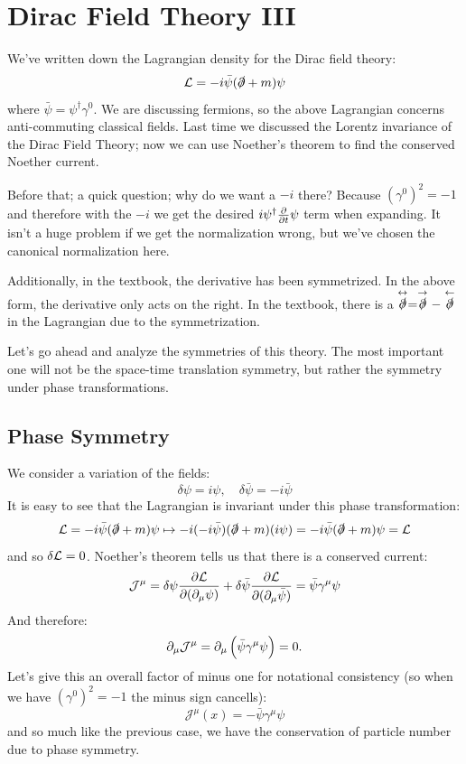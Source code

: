 \section{Dirac Field Theory III}
We've written down the Lagrangian density for the Dirac field theory:
\begin{equation}
    \mathcal{L} = -i\bar{\psi}(\slashed{\partial} + m)\psi
\end{equation}
where $\bar{\psi} = \psi^\dag \gamma^0$. We are discussing fermions, so the above Lagrangian concerns anti-commuting classical fields. Last time we discussed the Lorentz invariance of the Dirac Field Theory; now we can use Noether's theorem to find the conserved Noether current.

Before that; a quick question; why do we want a $-i$ there? Because $(\gamma^0)^2 = -1$ and therefore with the $-i$ we get the desired $i\psi^\dagger \frac{\partial }{\partial t}\psi$ term when expanding. It isn't a huge problem if we get the normalization wrong, but we've chosen the canonical normalization here.

Additionally, in the textbook, the derivative has been symmetrized. In the above form, the derivative only acts on the right. In the textbook, there is a $\stackrel{\leftrightarrow}{\slashed{\partial}} = \stackrel{\rightarrow}{\slashed{\partial}} - \stackrel{\leftarrow}{\slashed{\partial}}$ in the Lagrangian due to the symmetrization.

Let's go ahead and analyze the symmetries of this theory. The most important one will not be the space-time translation symmetry, but rather the symmetry under phase transformations.

\subsection{Phase Symmetry}
We consider a variation of the fields:
\begin{equation}
    \delta \psi = i\psi, \quad \delta \bar{\psi} = -i\bar{\psi}
\end{equation}
It is easy to see that the Lagrangian is invariant under this phase transformation:
\begin{equation}
    \mathcal{L} = -i\bar{\psi}(\slashed{\partial} + m)\psi \mapsto -i(-i\bar{\psi})(\slashed{\partial} + m)(i\psi) = -i\bar{\psi}(\slashed{\partial} + m)\psi = \mathcal{L}
\end{equation}
and so $\delta \mathcal{L} = 0$. Noether's theorem tells us that there is a conserved current:
\begin{equation}
    \mathcal{J}^\mu = \delta \psi \frac{\partial \mathcal{L}}{\partial (\partial_\mu \psi)} + \delta \bar{\psi}\frac{\partial \mathcal{L}}{\partial (\partial_\mu \bar{\psi})} = \bar{\psi}\gamma^\mu \psi
\end{equation}
And therefore:
\begin{equation}
    \partial_\mu \mathcal{J}^\mu = \partial_\mu\left(\bar{\psi}\gamma^\mu \psi\right) = 0.
\end{equation}
Let's give this an overall factor of minus one for notational consistency (so when we have $(\gamma^0)^2 = -1$ the minus sign cancells):
\begin{equation}
    \mathcal{J}^\mu(x) = -\bar{\psi}\gamma^\mu \psi
\end{equation}
and so much like the previous case, we have the conservation of particle number due to phase symmetry.

